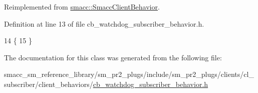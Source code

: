 Reimplemented from \hyperlink{classsmacc_1_1SmaccClientBehavior_a7962382f93987c720ad432fef55b123f}{smacc\+::\+Smacc\+Client\+Behavior}.



Definition at line 13 of file cb\+\_\+watchdog\+\_\+subscriber\+\_\+behavior.\+h.


\begin{DoxyCode}
14     \{
15     \}
\end{DoxyCode}


The documentation for this class was generated from the following file\+:\begin{DoxyCompactItemize}
\item 
smacc\+\_\+sm\+\_\+reference\+\_\+library/sm\+\_\+pr2\+\_\+plugs/include/sm\+\_\+pr2\+\_\+plugs/clients/cl\+\_\+subscriber/client\+\_\+behaviors/\hyperlink{sm__pr2__plugs_2include_2sm__pr2__plugs_2clients_2cl__subscriber_2client__behaviors_2cb__watchdog__subscriber__behavior_8h}{cb\+\_\+watchdog\+\_\+subscriber\+\_\+behavior.\+h}\end{DoxyCompactItemize}
